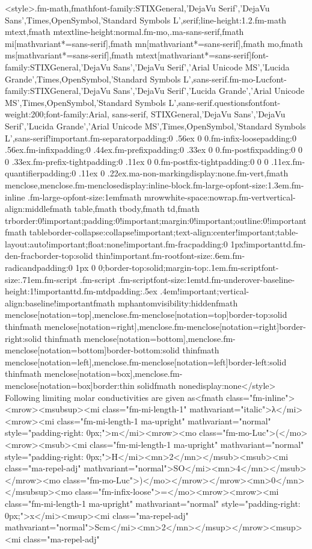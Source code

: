 \documentclass{article}
\begin{document}
<style>.fm-math,fmath{font-family:STIXGeneral,'DejaVu Serif','DejaVu Sans',Times,OpenSymbol,'Standard Symbols L',serif;line-height:1.2}.fm-math mtext,fmath mtext{line-height:normal}.fm-mo,.ma-sans-serif,fmath mi[mathvariant*=sans-serif],fmath mn[mathvariant*=sans-serif],fmath mo,fmath ms[mathvariant*=sans-serif],fmath mtext[mathvariant*=sans-serif]{font-family:STIXGeneral,'DejaVu Sans','DejaVu Serif','Arial Unicode MS','Lucida Grande',Times,OpenSymbol,'Standard Symbols L',sans-serif}.fm-mo-Luc{font-family:STIXGeneral,'DejaVu Sans','DejaVu Serif','Lucida Grande','Arial Unicode MS',Times,OpenSymbol,'Standard Symbols L',sans-serif}.questionsfont{font-weight:200;font-family:Arial, sans-serif, STIXGeneral,'DejaVu Sans','DejaVu Serif','Lucida Grande','Arial Unicode MS',Times,OpenSymbol,'Standard Symbols L',sans-serif!important}.fm-separator{padding:0 .56ex 0 0}.fm-infix-loose{padding:0 .56ex}.fm-infix{padding:0 .44ex}.fm-prefix{padding:0 .33ex 0 0}.fm-postfix{padding:0 0 0 .33ex}.fm-prefix-tight{padding:0 .11ex 0 0}.fm-postfix-tight{padding:0 0 0 .11ex}.fm-quantifier{padding:0 .11ex 0 .22ex}.ma-non-marking{display:none}.fm-vert,fmath menclose,menclose.fm-menclose{display:inline-block}.fm-large-op{font-size:1.3em}.fm-inline .fm-large-op{font-size:1em}fmath mrow{white-space:nowrap}.fm-vert{vertical-align:middle}fmath table,fmath tbody,fmath td,fmath tr{border:0!important;padding:0!important;margin:0!important;outline:0!important}fmath table{border-collapse:collapse!important;text-align:center!important;table-layout:auto!important;float:none!important}.fm-frac{padding:0 1px!important}td.fm-den-frac{border-top:solid thin!important}.fm-root{font-size:.6em}.fm-radicand{padding:0 1px 0 0;border-top:solid;margin-top:.1em}.fm-script{font-size:.71em}.fm-script .fm-script .fm-script{font-size:1em}td.fm-underover-base{line-height:1!important}td.fm-mtd{padding:.5ex .4em!important;vertical-align:baseline!important}fmath mphantom{visibility:hidden}fmath menclose[notation=top],menclose.fm-menclose[notation=top]{border-top:solid thin}fmath menclose[notation=right],menclose.fm-menclose[notation=right]{border-right:solid thin}fmath menclose[notation=bottom],menclose.fm-menclose[notation=bottom]{border-bottom:solid thin}fmath menclose[notation=left],menclose.fm-menclose[notation=left]{border-left:solid thin}fmath menclose[notation=box],menclose.fm-menclose[notation=box]{border:thin solid}fmath none{display:none}</style> Following limiting molar conductivities are given as\newline<fmath class="fm-inline"><mrow><msubsup><mi class="fm-mi-length-1" mathvariant="italic">λ</mi><mrow><mi class="fm-mi-length-1 ma-upright" mathvariant="normal" style="padding-right: 0px;">m</mi><mrow><mo class="fm-mo-Luc">(</mo><mrow><msub><mi class="fm-mi-length-1 ma-upright" mathvariant="normal" style="padding-right: 0px;">H</mi><mn>2</mn></msub><msub><mi class="ma-repel-adj" mathvariant="normal">SO</mi><mn>4</mn></msub></mrow><mo class="fm-mo-Luc">)</mo></mrow></mrow><mn>0</mn></msubsup><mo class="fm-infix-loose">=</mo><mrow><mrow><mi class="fm-mi-length-1 ma-upright" mathvariant="normal" style="padding-right: 0px;">x</mi><msup><mi class="ma-repel-adj" mathvariant="normal">Scm</mi><mn>2</mn></msup></mrow><msup><mi class="ma-repel-adj" 
\end{document}
